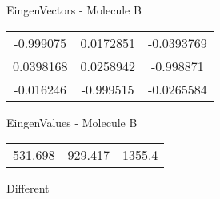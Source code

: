 \begin{multicols}{2}
\begin{center}
\vtab
 EingenVectors - Molecule B     \\
\vtab
\begin{tabular}{|c c c|}
-0.999075	 & 	0.0172851	 & 	-0.0393769	 \\
0.0398168	 & 	0.0258942	 & 	-0.998871	 \\
-0.016246	 & 	-0.999515	 & 	-0.0265584
\end{tabular}

\vtab
 EingenValues - Molecule B     \\
\vtab
\begin{tabular}{|c c c|}
531.698	 & 	929.417	 & 	1355.4	 \\
\end{tabular}

\end{center}
\end{multicols}
\begin{center}
\vtab
\vtab
\textcolor{NavyBlue}{\Large Different}
\end{center}

 \newpage

